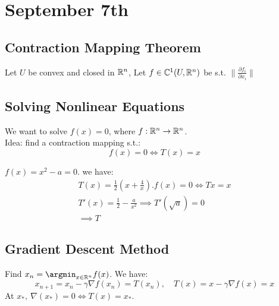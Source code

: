 \documentclass[../main/main.tex]{subfiles}
\begin{document}
\section{September 7th}
\subsection{Contraction Mapping Theorem}

\begin{example}
	Let \(U\) be convex and closed in \(\mathbb{R}^{n}\), Let \(f \in \mathbb{C}^{1}(U, \mathbb{R}^{n})\) be s.t. \(\|\frac{\partial f_i}{\partial x_i}\|\)
\end{example}

\subsection{Solving Nonlinear Equations}
We want to solve \(f(x) = 0\), where \(f: \mathbb{R}^{n} \to \mathbb{R}^{n}\).\\

Idea: find a contraction mapping s.t.: \[
	f(x) = 0 \iff T(x) = x
\]
\begin{example}
	$f(x) = x^2 - a = 0$. we have:
	\begin{align}
		T(x) = \frac{1}{2}\left(x + \frac{4}{x}\right). f(x) = 0 \iff Tx = x \\
		T'(x) = \frac{1}{2} - \frac{a}{x^2} \implies T'(\sqrt{a}) = 0        \\
		\implies T
	\end{align}
\end{example}


\subsection{Gradient Descent Method}
Find $x_n = \argmin_{x \in \R^{n}}f(x) $. We have: \[
	x_{n+1} = x_n - \gamma \nabla f(x_n) = T(x_n), \quad T(x) = x- \gamma \nabla f(x) = x
\]
At $x_{*}, \ \nabla(x_*) = 0 \iff T(x) = x_*$.
\end{document}
